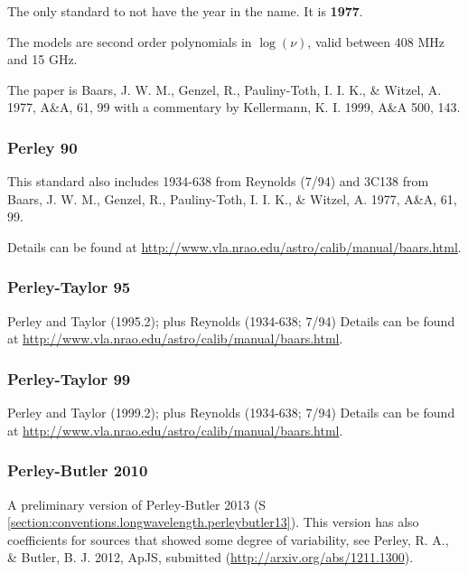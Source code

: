 The only standard to not have the year in the name.  It is \textbf{1977}.

The models are second order polynomials in $\log(\nu)$, valid between 408 MHz and
15 GHz.

The paper is Baars, J. W. M., Genzel, R., Pauliny-Toth, I. I. K., \&
Witzel, A. 1977, A\&A, 61, 99 with a commentary by 
Kellermann, K. I. 1999, A\&A 500, 143.


\subsubsection{Perley 90}
\label{section:conventions.longwavelength.perley90}

This standard also includes 1934-638 from Reynolds (7/94) and 3C138
from Baars, J. W. M., Genzel, R., Pauliny-Toth, I. I. K., \&  Witzel,
A. 1977, A\&A, 61, 99.

Details can be found at \url{http://www.vla.nrao.edu/astro/calib/manual/baars.html}.

\subsubsection{Perley-Taylor 95}
\label{section:conventions.longwavelength.perleytaylor95}

Perley and Taylor (1995.2); plus Reynolds (1934-638; 7/94)
Details can be found at \url{http://www.vla.nrao.edu/astro/calib/manual/baars.html}.

\subsubsection{Perley-Taylor 99}
\label{section:conventions.longwavelength.perleytaylor99}

Perley and Taylor (1999.2); plus Reynolds (1934-638; 7/94)
Details can be found at \url{http://www.vla.nrao.edu/astro/calib/manual/baars.html}.

 
\subsubsection{Perley-Butler 2010}
\label{section:conventions.longwavelength.perleybutler10}

A preliminary version of Perley-Butler 2013
(S\,\ref{section:conventions.longwavelength.perleybutler13}). This
version has also coefficients for sources that showed some degree of
variability, see Perley, R. A., \& Butler, B. J. 2012, ApJS, submitted
(\url{http://arxiv.org/abs/1211.1300}).


